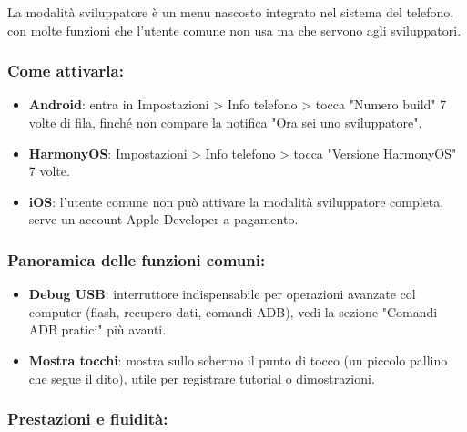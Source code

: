 


La modalità sviluppatore è un menu nascosto integrato nel sistema del telefono, con molte funzioni che l'utente comune non usa ma che servono agli sviluppatori.

\subsubsection*{Come attivarla:}

\begin{itemize}
  \item \textbf{Android}: entra in Impostazioni > Info telefono > tocca "Numero build" 7 volte di fila, finché non compare la notifica "Ora sei uno sviluppatore".
  \item \textbf{HarmonyOS}: Impostazioni > Info telefono > tocca "Versione HarmonyOS" 7 volte.
  \item \textbf{iOS}: l'utente comune non può attivare la modalità sviluppatore completa, serve un account Apple Developer a pagamento.
\end{itemize}

\subsubsection*{Panoramica delle funzioni comuni:}

\begin{itemize}
  \item \textbf{Debug USB}: interruttore indispensabile per operazioni avanzate col computer (flash, recupero dati, comandi ADB), vedi la sezione "Comandi ADB pratici" più avanti.
  \item \textbf{Mostra tocchi}: mostra sullo schermo il punto di tocco (un piccolo pallino che segue il dito), utile per registrare tutorial o dimostrazioni.
\end{itemize}

\subsubsection*{Prestazioni e fluidità:}

